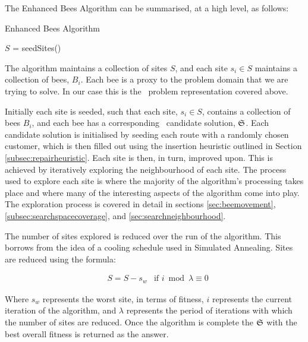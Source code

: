 The Enhanced Bees Algorithm can be summarised, at a high level, as follows:

\begin{algorithm}[H]
   \caption{Enhanced Bees Algorithm}
   $S$ = seedSites() \\

\end{algorithm}

The algorithm maintains a collection of sites $S$, and each site $s_i \in S$ maintains a collection of bees, $B_i$. Each bee is a proxy to the problem domain that we are trying to solve. In our case this is the \VRP\ problem representation covered above.

Initially each site is seeded, such that each site, $s_i \in S$, contains a collection of bees $B_i$, and each bee has a corresponding \VRP\ candidate solution, $\mathfrak{S}$. Each candidate solution is initialised by seeding each route with a randomly chosen customer, which is then filled out using the insertion heuristic outlined in Section \ref{subsec:repairheuristic}. Each site is then, in turn, improved upon. This is achieved by iteratively exploring the neighbourhood of each site. The process used to explore each site is where the majority of the algorithm's processing takes place and where many of the interesting aspects of the algorithm come into play. The exploration process is covered in detail in sections \ref{sec:beemovement}, \ref{subsec:searchspacecoverage}, and \ref{sec:searchneighbourhood}.

The number of sites explored is reduced over the run of the algorithm. This borrows from the idea of a cooling schedule used in Simulated Annealing. Sites are reduced using the formula:

\begin{align}
   & S = S - s_w & \text{if $i \bmod{\lambda} \equiv 0$}
\end{align}

Where $s_w$ represents the worst site, in terms of fitness, $i$ represents the current iteration of the algorithm, and $\lambda$ represents the period of iterations with which the number of sites are reduced. Once the algorithm is complete the $\mathfrak{S}$ with the best overall fitness is returned as the answer.

